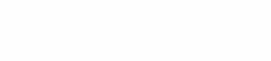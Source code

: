 
\afterpage{\restoregeometry}
\pagecolor{black}\afterpage{\nopagecolor}

\thispagestyle{empty}
\begin{center}
\vspace{1cm}

\textcolor{white}{
\titlefont Differential Cohomology \\[0.3cm]
\subtitlefont Categories, Characteristic\\Classes, and Connections\\[0.75cm]
\subsubtitlefont Edited by Araminta Amabel, Arun Debray, and Peter Haine
}
\end{center}

